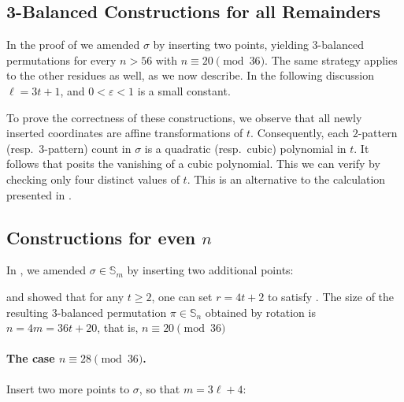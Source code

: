 \documentclass{article}
\newcommand{\threeb}{$3$-balanced\xspace}
\newcommand{\eqdef}{\vcentcolon=}
\theoremstyle{remark}
\theoremstyle{plain}
\begin{document}
\begin{appendices}
\pagebreak
\section{3-Balanced Constructions for all Remainders}
\label{section:other_3bal}

In the proof of  we amended $\sigma$ by inserting two points, yielding \threeb permutations for every $n > 56$ with $n \equiv 20 \pmod {36}$. The same strategy applies to the other residues as well, as we now describe. In the following discussion $\ell = 3t+1$, and $0 < \varepsilon < 1$ is a small constant. 

To prove the correctness of these constructions, we observe that all newly inserted coordinates are affine transformations of $t$. Consequently, each $2$-pattern (resp.\ $3$-pattern) count in $\sigma$ is a quadratic (resp.\ cubic) polynomial in $t$. It follows that  posits the vanishing of a cubic polynomial. This we can verify by checking only four distinct values of $t$. This is an alternative to the calculation presented in .

\subsection{Constructions for even \texorpdfstring{$n$}{n}}
\label{subsect:constructions_even_n}

In , we amended $\sigma\in\mathbb{S}_m$ by inserting two additional points:

\addstackgap[7pt]{\begin{tabular}{p{1.5cm} p{5.5cm} p{5.5cm}}
& $(x_1,y_1) \eqdef (r+2+\varepsilon,\ r+\ell+\varepsilon)$ & $(x_2,y_2) \eqdef (r+\ell+\varepsilon,\ r-\varepsilon)$
\end{tabular}}

\noindent and showed that for any $t\geq 2$, one can set $r=4t+2$ to satisfy . The size of the resulting \threeb permutation $\pi\in\mathbb{S}_n$ obtained by rotation is $n=4m=36t+20$, that is, $n \equiv 20 \pmod {36}$

\paragraph{The case $n \equiv 28 \pmod {36}$.} Insert two more points to $\sigma$, so that $m=3\ell+4$:


\end{appendices}
\end{document}
